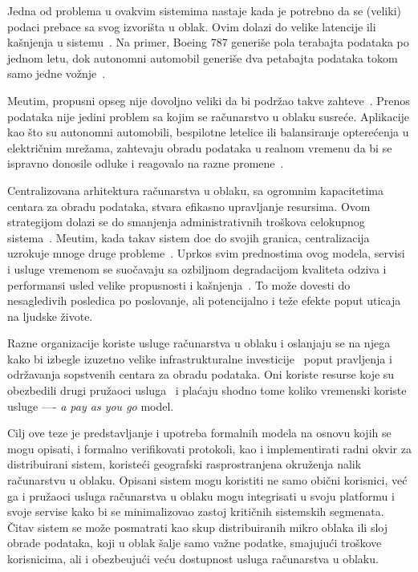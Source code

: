 Jedna od problema u ovakvim sistemima nastaje kada je potrebno da se (veliki) podaci prebace sa svog izvori\v sta u oblak. Ovim dolazi do velike latencije ili ka\v snjenja u sistemu~\cite {HossainRH18}. Na primer, Boeing 787 generi\v se pola terabajta podataka po jednom letu, dok autonomni automobil generi\v se dva petabajta podataka tokom samo jedne vo\v znje~\cite{CaoZS18}. 

Me\dj utim, propusni opseg nije dovoljno veliki da bi podr\v zao takve zahteve~\cite{CaoZS18}. Prenos podataka nije jedini problem sa kojim se ra\v cunarstvo u oblaku susre\'ce. Aplikacije kao \v sto su autonomni automobili, bespilotne letelice ili balansiranje optere\'cenja u elektri\v cnim mre\v zama, zahtevaju obradu podataka u realnom vremenu da bi se ispravno donosile odluke i reagovalo na razne promene~\cite{CaoZS18}.

Centralizovana arhitektura ra\v cunarstva u oblaku, sa ogromnim kapacitetima centara za obradu podataka, stvara efikasno upravljanje resursima. Ovom strategijom dolazi se do smanjenja administrativnih tro\v skova celokupnog sistema~\cite{BariBEGPRZZ13}. Me\dj utim, kada takav sistem do\dj e do svojih granica, centralizacija uzrokuje mnoge druge probleme~\cite{GunawiHSLSAE16, LopezMEDHIBFR15}. Uprkos svim prednostima ovog modela, servisi i usluge vremenom se suo\v cavaju sa ozbiljnom degradacijom kvaliteta odziva i performansi usled velike propusnosti i ka\v snjenja~\cite{KarimIWGSYO16}. To mo\v ze dovesti do nesagledivih posledica po poslovanje, ali potencijalno i te\v ze efekte poput uticaja na ljudske \v zivote. 

Razne organizacije koriste usluge ra\v cunarstva u oblaku i oslanjaju se na njega kako bi izbegle izuzetno velike infrastrukturalne investicije~\cite {MonsalveCC18} poput pravljenja i odr\v zavanja sopstvenih centara za obradu podataka. Oni koriste resurse koje su obezbedili drugi pru\v zaoci usluga~\cite{Satyanarayanan17} i pla\'caju shodno tome koliko vremenski koriste usluge ---- \emph{a pay as you go} model.

Cilj ove teze je predstavljanje i upotreba formalnih modela na osnovu kojih se mogu opisati, i formalno verifikovati protokoli, kao i implementirati radni okvir za distribuirani sistem, koriste\'ci geografski rasprostranjena okru\v zenja nalik ra\v cunarstvu u oblaku. Opisani sistem mogu koristiti ne samo obi\v cni korisnici, ve\'c ga i pru\v zaoci usluga ra\v cunarstva u oblaku mogu integrisati u svoju platformu i svoje servise kako bi se minimalizovao zastoj kriti\v cnih sistemskih segmenata. \v Citav sistem se mo\v ze posmatrati kao skup distribuiranih mikro oblaka ili sloj obrade podataka, koji u oblak \v salje samo va\v zne podatke, smajuju\'ci tro\v skove korisnicima, ali i obezbe\dj uju\'ci ve\'cu dostupnost usluga ra\v cunarstva u oblaku.


